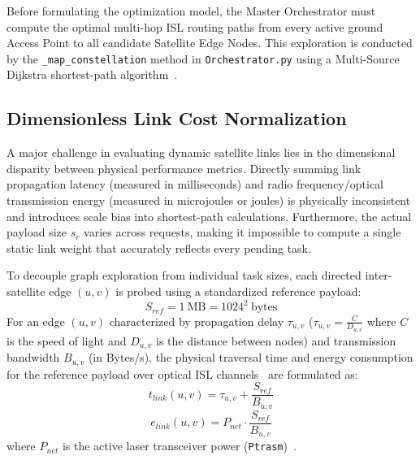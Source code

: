 Before formulating the optimization model, the Master Orchestrator must compute the optimal multi-hop ISL routing paths from every active ground Access Point to all candidate Satellite Edge Nodes. 
This exploration is conducted by the \texttt{\_map\_constellation} method in \texttt{Orchestrator.py} using a Multi-Source Dijkstra shortest-path algorithm~\cite{dijkstra1959note, bagini_repo_2026}.

\subsection{Dimensionless Link Cost Normalization}
\label{subsec:metric_normalization}

A major challenge in evaluating dynamic satellite links lies in the dimensional disparity between physical performance metrics. 
Directly summing link propagation latency (measured in milliseconds) and radio frequency/optical transmission energy (measured in microjoules or joules) is physically inconsistent and introduces scale bias into shortest-path calculations. 
Furthermore, the actual payload size $s_r$ varies across requests, making it impossible to compute a single static link weight that accurately reflects every pending task.

To decouple graph exploration from individual task sizes, each directed inter-satellite edge $(u, v)$ is probed using a standardized reference payload:
\begin{equation}
    S_{ref} = 1~\text{MB} = 1024^2~\text{bytes}
\end{equation}
For an edge $(u, v)$ characterized by propagation delay $\tau_{u,v}$ ($\tau_{u,v} = \frac{C}{D_{u,v}}$ where $C$ is the speed of light and $D_{u,v}$ is the distance between nodes) and transmission bandwidth $B_{u,v}$ (in Bytes/s), the physical traversal time and energy consumption for the reference payload over optical ISL channels~\cite{chen2021isl, chaudhry2021laser} are formulated as:
\begin{equation}
    t_{link}(u,v) = \tau_{u,v} + \frac{S_{ref}}{B_{u,v}}
    \label{eq:t_link}
\end{equation}
\begin{equation}
    e_{link}(u,v) = P_{net} \cdot \frac{S_{ref}}{B_{u,v}}
    \label{eq:e_link}
\end{equation}
where $P_{net}$ is the active laser transceiver power (\texttt{Ptrasm})~\cite{icdcs_satellite_2025}.

